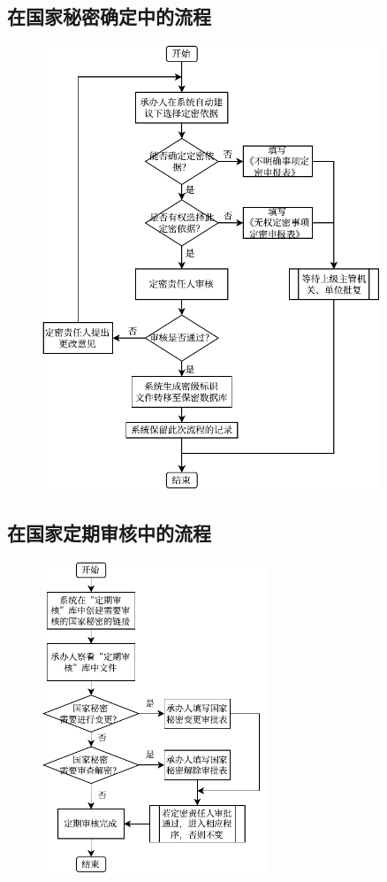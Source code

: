 \subsection{在国家秘密确定中的流程}
\begin{figure}[H]
    \centering
    \includegraphics[width=0.9\textwidth]{figure/确定}
\end{figure}

\subsection{在国家定期审核中的流程}

\begin{figure}[H]
    \centering
    \includegraphics[width=0.6\textwidth]{figure/定期审核}
\end{figure}

